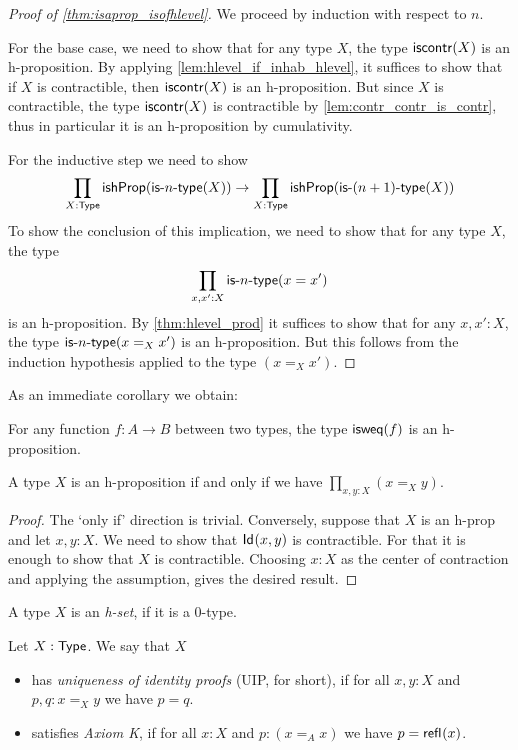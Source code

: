 \begin{proof}[Proof of \autoref{thm:isaprop_isofhlevel}]
  We proceed by induction with respect to $n$.

 For the base case, we need to show that for any type $X$, the type $\mathsf{iscontr}(X)$ is an
        h-proposition. By applying \autoref{lem:hlevel_if_inhab_hlevel}, it suffices to show that
        if $X$ is contractible, then $\mathsf{iscontr}(X)$ is an h-proposition.
        But since $X$ is contractible, the type $\mathsf{iscontr}(X)$ is contractible by \autoref{lem:contr_contr_is_contr},
          thus in particular it is an h-proposition by cumulativity.

For the inductive step we need to show
\[\prod_{X : \mathsf{Type}} \mathsf{ishProp} (\mathsf{is}\mbox{-}{n}\mbox{-}\mathsf{type}(X)) \to \prod_{X : \mathsf{Type}} \mathsf{ishProp} (\mathsf{is}\mbox{-}{(n+1)}\mbox{-}\mathsf{type}(X)) \]
To show the conclusion of this implication, we need to show that for any type $X$, the type
    \[\prod_{x, x' : X}\mathsf{is}\mbox{-}{n}\mbox{-}\mathsf{type}(x = x')\]
is an h-proposition. By \autoref{thm:hlevel_prod} it suffices to show that for any $x, x' : X$, the type $\mathsf{is}\mbox{-}{n}\mbox{-}\mathsf{type}(x =_X x')$ is an h-proposition.
But this follows from the induction hypothesis applied to the type $(x =_X x')$.
\end{proof}

As an immediate corollary we obtain:

\begin{cor}
 For any function $f \colon A \to B$ between two types, the type $\mathsf{isweq}(f)$ is an h-proposition.
\end{cor}

\begin{thm}
 A type $X$ is an h-proposition if and only if we have $\prod\limits_{x, y : X} (x =_X y)$.
\end{thm}

\begin{proof}
 The `only if' direction is trivial. Conversely, suppose that $X$ is an h-prop and let $x, y : X$. We need to show that $\mathsf{Id}_{}(x,y)$ is contractible. For that it is enough to show that $X$ is contractible. Choosing $x : X$ as the center of contraction and applying the assumption, gives the desired result.
\end{proof}

\begin{defn}
 A type $X$ is an {\em h-set}, if it is a $0$-type.
\end{defn}

\begin{defn}
 Let $X : \mathsf{Type}$. We say that $X$
 \begin{itemize}
  \item has {\em uniqueness of identity proofs} (UIP, for short), if for all $x, y : X$ and $p, q : x =_X y$ we have $p = q$.
  \item satisfies {\em Axiom K}, if for all $x : X$ and $p : (x =_A x)$ we have $p = \mathsf{refl}_{}(x)$.
 \end{itemize}
\end{defn}

